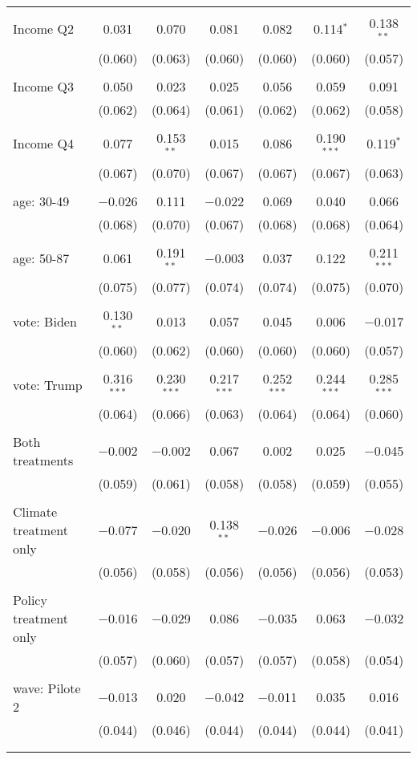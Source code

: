 \begin{tabular}{@{\extracolsep{5pt}}lcccccc}
  & & & & & & \\ 
 Income Q2 & 0.031 & 0.070 & 0.081 & 0.082 & 0.114$^{*}$ & 0.138$^{**}$ \\ 
  & (0.060) & (0.063) & (0.060) & (0.060) & (0.060) & (0.057) \\ 
  & & & & & & \\ 
 Income Q3 & 0.050 & 0.023 & 0.025 & 0.056 & 0.059 & 0.091 \\ 
  & (0.062) & (0.064) & (0.061) & (0.062) & (0.062) & (0.058) \\ 
  & & & & & & \\ 
 Income Q4 & 0.077 & 0.153$^{**}$ & 0.015 & 0.086 & 0.190$^{***}$ & 0.119$^{*}$ \\ 
  & (0.067) & (0.070) & (0.067) & (0.067) & (0.067) & (0.063) \\ 
  & & & & & & \\ 
 age: 30-49 & $-$0.026 & 0.111 & $-$0.022 & 0.069 & 0.040 & 0.066 \\ 
  & (0.068) & (0.070) & (0.067) & (0.068) & (0.068) & (0.064) \\ 
  & & & & & & \\ 
 age: 50-87 & 0.061 & 0.191$^{**}$ & $-$0.003 & 0.037 & 0.122 & 0.211$^{***}$ \\ 
  & (0.075) & (0.077) & (0.074) & (0.074) & (0.075) & (0.070) \\ 
  & & & & & & \\ 
 vote: Biden & 0.130$^{**}$ & 0.013 & 0.057 & 0.045 & 0.006 & $-$0.017 \\ 
  & (0.060) & (0.062) & (0.060) & (0.060) & (0.060) & (0.057) \\ 
  & & & & & & \\ 
 vote: Trump & 0.316$^{***}$ & 0.230$^{***}$ & 0.217$^{***}$ & 0.252$^{***}$ & 0.244$^{***}$ & 0.285$^{***}$ \\ 
  & (0.064) & (0.066) & (0.063) & (0.064) & (0.064) & (0.060) \\ 
  & & & & & & \\ 
 Both treatments & $-$0.002 & $-$0.002 & 0.067 & 0.002 & 0.025 & $-$0.045 \\ 
  & (0.059) & (0.061) & (0.058) & (0.058) & (0.059) & (0.055) \\ 
  & & & & & & \\ 
 Climate treatment only & $-$0.077 & $-$0.020 & 0.138$^{**}$ & $-$0.026 & $-$0.006 & $-$0.028 \\ 
  & (0.056) & (0.058) & (0.056) & (0.056) & (0.056) & (0.053) \\ 
  & & & & & & \\ 
 Policy treatment only & $-$0.016 & $-$0.029 & 0.086 & $-$0.035 & 0.063 & $-$0.032 \\ 
  & (0.057) & (0.060) & (0.057) & (0.057) & (0.058) & (0.054) \\ 
  & & & & & & \\ 
 wave: Pilote 2 & $-$0.013 & 0.020 & $-$0.042 & $-$0.011 & 0.035 & 0.016 \\ 
  & (0.044) & (0.046) & (0.044) & (0.044) & (0.044) & (0.041) \\ 
  & & & & & & \\ 
\hline \\[-1.8ex] 


\end{tabular}
